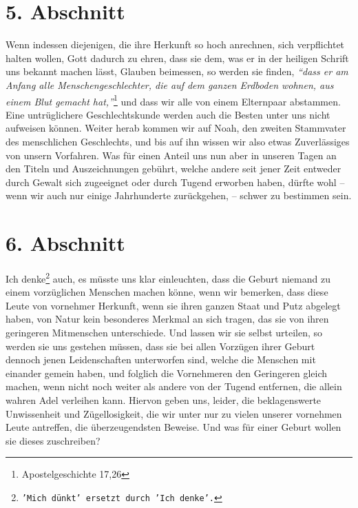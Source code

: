\section{5. Abschnitt} \label{kap11_ab5}

Wenn indessen diejenigen, die ihre Herkunft so hoch anrechnen, sich verpflichtet
halten wollen, Gott dadurch zu ehren, dass sie dem, was er in der heiligen
Schrift uns bekannt machen lässt, Glauben beimessen, so werden sie finden,
\textit{"`dass
er am Anfang alle Menschengeschlechter, die auf dem ganzen Erdboden wohnen,
aus einem Blut gemacht hat,"'}\footnote{Apostelgeschichte 17,26}
und dass wir alle
von einem Elternpaar abstammen. Eine untrüglichere Geschlechtskunde werden auch
die Besten unter uns nicht aufweisen können. Weiter herab kommen wir auf
Noah, den zweiten Stammvater des menschlichen Geschlechts,
und bis auf ihn
wissen wir also etwas Zuverlässiges von unsern Vorfahren. Was für einen Anteil
uns nun aber in unseren Tagen an den Titeln und Auszeichnungen gebührt, welche
andere seit jener Zeit entweder durch Gewalt sich zugeeignet oder
durch Tugend
erworben haben, dürfte wohl -- wenn wir auch nur einige Jahrhunderte
zurückgehen, -- schwer zu bestimmen sein.

\section{6. Abschnitt} \label{kap11_ab6}

Ich denke\footnote{\texttt{'Mich dünkt' ersetzt durch 'Ich denke'.}} auch, es
müsste uns klar einleuchten, dass die Geburt niemand zu einem
vorzüglichen Menschen machen könne, wenn wir bemerken, dass diese Leute von
vornehmer Herkunft, wenn sie ihren ganzen Staat und Putz abgelegt haben, von
Natur kein besonderes Merkmal an sich tragen, das sie von ihren geringeren
Mitmenschen unterschiede. Und lassen wir sie selbst urteilen, so werden sie
uns gestehen müssen, dass sie bei allen Vorzügen ihrer Geburt dennoch jenen
Leidenschaften unterworfen sind, welche die Menschen mit
einander gemein haben,
und folglich die Vornehmeren den Geringeren gleich machen, wenn nicht noch
weiter
als andere von der Tugend entfernen, die allein wahren Adel verleihen kann.
Hiervon geben uns, leider, die beklagenswerte Unwissenheit und Zügellosigkeit,
die wir unter nur zu vielen unserer vornehmen Leute antreffen, die
überzeugendsten Beweise. Und was für einer Geburt wollen sie dieses zuschreiben?

